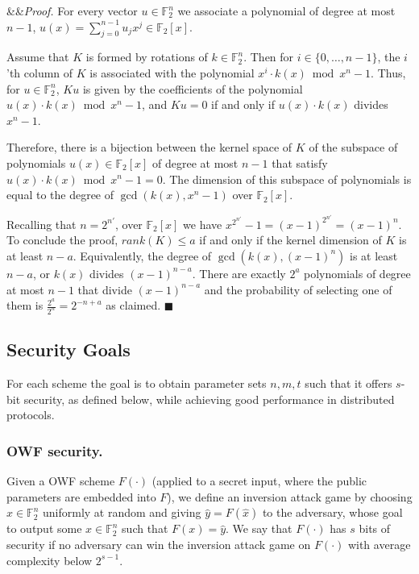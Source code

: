 \documentclass[orivec,envcountsect]{llncs}
\renewenvironment{proof}[1][]
    {\noindent
       \ifx&#1&{\it Proof.}
       \else{\it Proof ({#1}).}
       \fi}{\hfill $\blacksquare$}
\begin{document}
\begin{proof}
For every vector $u \in \mathbb{F}_2^{n}$
we associate a polynomial of degree at most $n-1$,
$u(x) = \sum_{j=0}^{n-1} u_j x^{j} \in \mathbb{F}_2[x]$. 

Assume that $K$ is formed by rotations 
of $k \in \mathbb{F}_2^{n}$.
Then for $i \in \{0,\ldots, n-1\}$,
the $i$'th column of $K$ is associated with the polynomial
$x^i \cdot k(x) \bmod x^n - 1$. 
Thus, for $u \in \mathbb{F}_2^{n}$, $Ku$ is given 
by the coefficients of the polynomial
$u(x) \cdot k(x) \bmod x^n - 1$,
and $Ku = 0$ if and only if 
$u(x) \cdot k(x)$ divides $x^n - 1$.

Therefore, there is a bijection between the kernel space of $K$ 
of the subspace of polynomials $u(x) \in \mathbb{F}_2[x]$ 
of degree at most $n-1$  
that satisfy $u(x) \cdot k(x) \bmod x^n - 1 = 0$.
The dimension of this subspace of polynomials is equal to 
the degree of $\gcd(k(x), x^n - 1)$ over $\mathbb{F}_2[x]$.

Recalling that $n = 2^{n'}$, over $\mathbb{F}_2[x]$ we have 
$x^{2^{n'}} - 1 = (x - 1)^{2^{n'}} = (x - 1)^n$.
To conclude the proof,
$rank(K) \leq a$ if and only if
the kernel dimension of $K$ is at least $n-a$.
Equivalently, the degree of $\gcd(k(x), (x - 1)^n)$
is at least $n-a$, or
$k(x)$ divides $(x - 1)^{n-a}$.
There are exactly $2^a$ polynomials of degree at most
$n-1$ that divide $(x - 1)^{n-a}$
and the probability of selecting one of them is 
$\tfrac{2^{a}}{2^n} = 2^{-n+a}$ as claimed. 
\end{proof}
 
  


\subsection{Security Goals}
For each scheme the goal is to obtain parameter sets $n,m,t$ such that it offers
$s$-bit security, as defined below, while achieving good performance in distributed protocols.

\subsubsection{OWF security.}

Given a OWF scheme $F(\cdot)$ (applied to a secret input, where the public parameters are embedded into $F$),
we define an inversion attack game by choosing $\hat{x} \in \mathbb{F}_2^n$
uniformly at random and giving $\hat{y}= F(\hat{x})$ to the adversary, whose
goal to output some $x \in \mathbb{F}_2^n$ such that $F(x) = \hat{y}$.
We say that $F(\cdot)$ has $s$ bits of security if no adversary can win the inversion attack game on $F(\cdot)$ with average complexity below $2^{s-1}$.
\end{document}
